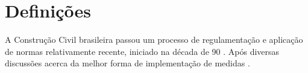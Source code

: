\section{Definições}
    A Construção Civil brasileira passou um processo de regulamentação e aplicação de
    normas relativamente recente, iniciado na década de 90 \cite{Chen2019}.
    Após diversas discussões acerca da melhor forma de implementação de
    medidas \cite{U.S.DepartmentofEnergy-USDOE2011}.
